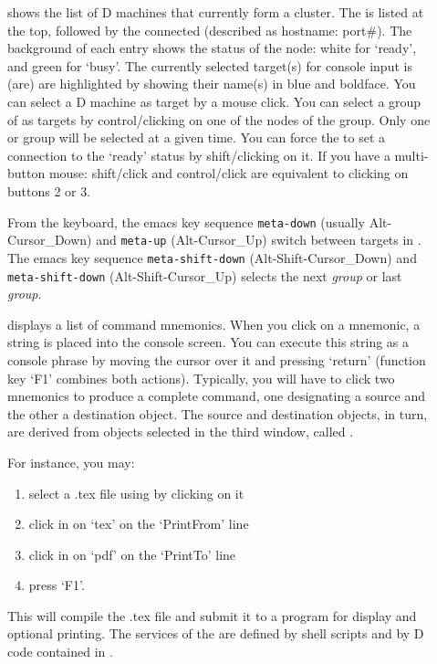 \begin{description}
\item[] shows the list of D machines that currently
  form a cluster. The  is listed at the top, followed by
  the connected  (described as hostname:
  port\#). The background of each entry shows the status of the node:
  white for `ready', and green for `busy'. The currently selected
  target(s) for console input is (are) are highlighted by showing
  their name(s) in blue and boldface. You can select a D machine as
  target by a mouse click. You can select a group of
   as targets by control/clicking on one of the
  nodes of the group. Only one  or group will be selected
  at a given time. You can force the  to set a
   connection to the `ready' status by shift/clicking on
  it. If you have a multi-button mouse: shift/click and control/click
  are equivalent to clicking on buttons 2 or 3.

  From the keyboard, the emacs key sequence \texttt{meta-down}
  (usually Alt-Cursor\_Down) and \texttt{meta-up} (Alt-Cursor\_Up)
  switch between targets in . The emacs key sequence
  \texttt{meta-shift-down} (Alt-Shift-Cursor\_Down) and
  \texttt{meta-shift-down} (Alt-Shift-Cursor\_Up) selects the next
  \emph{group} or last \emph{group}.

\item[] displays a list of command mnemonics. When you
  click on a mnemonic, a string is placed into the console screen. You
  can execute this string as a console phrase by moving the cursor
  over it and pressing `return' (function key `F1' combines both
  actions). Typically, you will have to click two mnemonics to produce
  a complete command, one designating a source and the other a
  destination object. The source and destination objects, in turn, are
  derived from objects selected in the third window, called
  .

  \begin{nopb}
  For instance, you may: 
  \begin{enumerate}
  \item select a .tex file using  by clicking on it
  \item click in  on `tex' on the `PrintFrom' line
  \item click in  on `pdf' on the `PrintTo' line
  \item press `F1'.
  \end{enumerate}
  This will compile the .tex file and submit it to a program for
  display and optional printing. The services of the 
  are defined by shell scripts and by D code contained in
  .
  \end{nopb}


\end{description}
